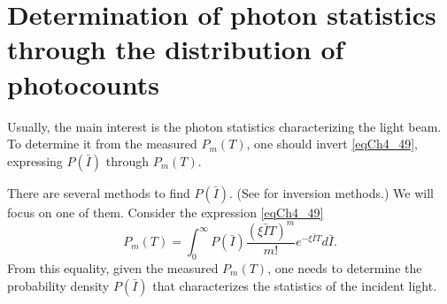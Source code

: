\section{Determination of photon statistics through the distribution of photocounts}
Usually, the main interest is the photon statistics characterizing the light beam. To determine it from the measured
$P_m\left(T\right)$, one should invert \eqref{eqCh4_49}, expressing
$P\left(\bar{I}\right)$ through $P_m\left(T\right)$.

There are several methods to find $P\left(\bar{I}\right)$. (See \cite{bDvait1973} for inversion methods.) We will focus on one of them. Consider the expression \eqref{eqCh4_49}
\[
P_m\left(T\right) = 
\int_0^{\infty}
P\left(\bar{I}\right)
\frac{\left(\xi \bar{I}T\right)^m}{m!} e^{-
  \xi \bar{I} T} 
d \bar{I}.
\]
From this equality, given the measured $P_m\left(T\right)$, one needs to determine
the probability density $P\left(\bar{I}\right)$ that characterizes
the statistics of the incident light.

